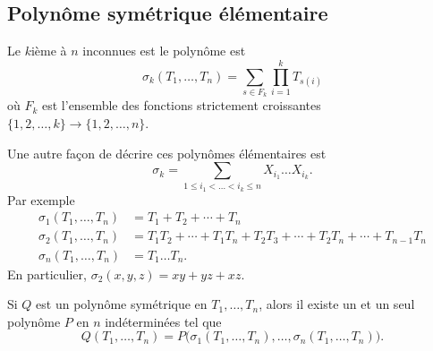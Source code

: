 \subsection{Polynôme symétrique élémentaire}

\begin{definition}  \label{DEFooTREUooZKoXeg}
    Le \( k\)ième  à \( n\) inconnues est le polynôme est
    \begin{equation}
        \sigma_k(T_1,\ldots, T_n)=\sum_{s\in F_k}\prod_{i=1}^kT_{s(i)}
    \end{equation}
    où \( F_k\) est l'ensemble des fonctions strictement croissantes \( \{ 1,2,\ldots, k \}\to\{ 1,2,\ldots, n \}\). 
\end{definition}

Une autre façon de décrire ces polynômes élémentaires est
\begin{equation}
    \sigma_k=\sum_{1\leq i_1<\ldots<i_k\leq n}X_{i_1}\ldots X_{i_k}.
\end{equation}
Par exemple
\begin{subequations}
    \begin{align}
        \sigma_1(T_1,\ldots, T_n)&=T_1+T_2+\cdots +T_n\\
        \sigma_2(T_1,\ldots, T_n)&=T_1T_2+\cdots +T_1T_n+T_2T_3+\cdots +T_2T_n+\cdots +T_{n-1}T_n\\
        \sigma_n(T_1,\ldots, T_n)&=T_1\ldots T_n.
    \end{align}
\end{subequations}
En particulier, \( \sigma_2(x,y,z)=xy+yz+xz\).

\begin{theorem}  \label{TholReBiw}
    Si \( Q\) est un polynôme symétrique en \( T_1,\ldots, T_n\), alors il existe un et un seul polynôme \( P\) en \( n\) indéterminées tel que
    \begin{equation}
        Q(T_1,\ldots, T_n)=P\big( \sigma_1(T_1,\ldots, T_n),\ldots, \sigma_n(T_1,\ldots, T_n) \big).
    \end{equation}
\end{theorem}


